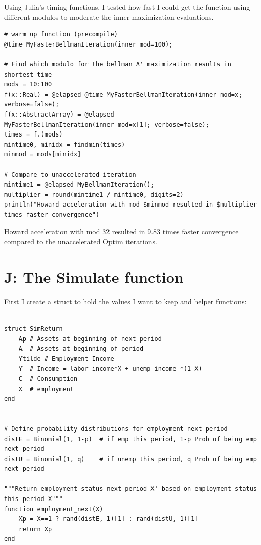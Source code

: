 \documentclass[12pt]{article}
\begin{document}
Using Julia's timing functions, I tested how fast I could get the function using different modulos to moderate the inner maximization evaluations.
\begin{lstlisting}[language=JuliaLocal, style=julia]
# warm up function (precompile)
@time MyFasterBellmanIteration(inner_mod=100);

# Find which modulo for the bellman A' maximization results in shortest time
mods = 10:100
f(x::Real) = @elapsed @time MyFasterBellmanIteration(inner_mod=x; verbose=false);
f(x::AbstractArray) = @elapsed MyFasterBellmanIteration(inner_mod=x[1]; verbose=false);
times = f.(mods)
mintime0, minidx = findmin(times)
minmod = mods[minidx]

# Compare to unaccelerated iteration
mintime1 = @elapsed MyBellmanIteration();
multiplier = round(mintime1 / mintime0, digits=2)
println("Howard acceleration with mod $minmod resulted in $multiplier times faster convergence")
\end{lstlisting}



Howard acceleration with mod 32 resulted in 9.83 times faster convergence compared to the unaccelerated Optim iterations.









\newpage
\section*{J: The Simulate function}

First I create a struct to hold the values I want to keep and helper functions:
\begin{lstlisting}[language=JuliaLocal, style=julia]

struct SimReturn
    Ap # Assets at beginning of next period
    A  # Assets at beginning of period
    Ytilde # Employment Income
    Y  # Income = labor income*X + unemp income *(1-X)
    C  # Consumption
    X  # employment
end


# Define probability distributions for employment next period
distE = Binomial(1, 1-p)  # if emp this period, 1-p Prob of being emp next period
distU = Binomial(1, q)    # if unemp this period, q Prob of being emp next period

"""Return employment status next period X' based on employment status this period X"""
function employment_next(X)
    Xp = X==1 ? rand(distE, 1)[1] : rand(distU, 1)[1]
    return Xp
end
\end{lstlisting}
\end{document}
